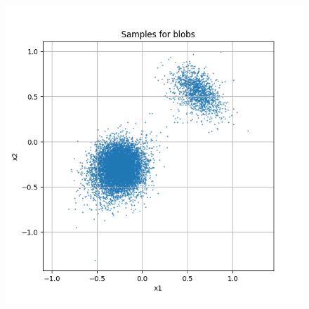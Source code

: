 \documentclass[a4paper,12pt]{article}
\begin{document}
\begin{figure}[H]
\begin{minipage}{0.3\textwidth}
  \end{minipage}
  \begin{minipage}{0.3\textwidth}
      \centering
      \includegraphics[width=\linewidth]{"images/Samples for ddpm_2_200_0.0001_0.05_blobs_linear.png"}
  \end{minipage}

  \vspace{0.5cm}


\end{figure}
\end{document}
